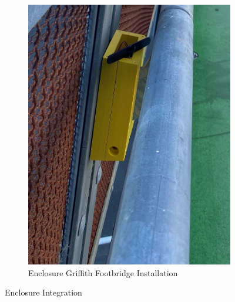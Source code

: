 \begin{figure}[H]
\begin{subfigure}{.5\textwidth}
		\includegraphics[scale=0.3]{Sections/Design-Process/enclosure-griffith.png}
		\caption{Enclosure Griffith Footbridge Installation}
		\label{enclosure-griffith}
	\end{subfigure}
	\caption{Enclosure Integration}
	\label{enclosure-integration}
\end{figure}

